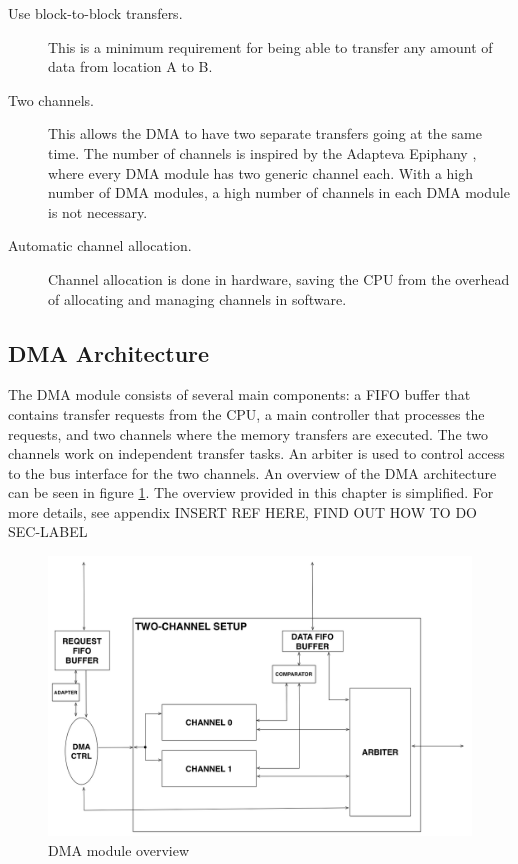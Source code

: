 \begin{description}
	\item[Use block-to-block transfers.] This is a minimum requirement for being
	able to transfer any amount of data from location A to B.
	\item[Two channels.] This allows the DMA to have two separate transfers going
	at the same time.
	The number of channels is inspired by the Adapteva Epiphany \cite{epiphany}, where every DMA module has two generic channel each.
	With a high number of DMA modules, a high number of channels in each DMA module is not necessary.
	\item[Automatic channel allocation.] Channel allocation is done in hardware,
	saving the CPU from the overhead of allocating and managing channels in software.
\end{description}

\subsection{DMA Architecture}

The DMA module consists of several main components: a FIFO buffer that contains transfer
requests from the CPU, a main controller that processes the requests, and two channels
where the memory transfers are executed. The two channels work on independent transfer
tasks. An arbiter is used to control access to the bus interface for the two channels.
An overview of the DMA architecture can be seen in figure \ref{fig:DMATopView2}.
The overview provided in this chapter is simplified.
For more details, see appendix  INSERT REF HERE, FIND OUT HOW TO DO SEC-LABEL

\begin{figure}[htb]
    \centering
    \includegraphics[width=1\textwidth]{Figures/DMA/TopViewFinalSimple2}
    \caption{DMA module overview}
    \label{fig:DMATopView2}
\end{figure}

